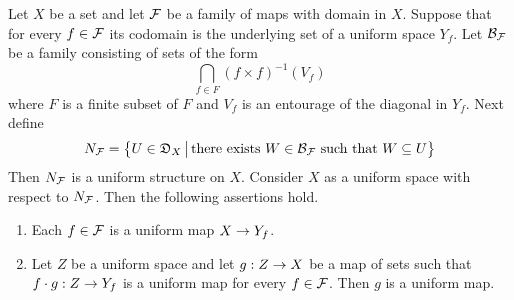 \documentclass[10pt]{amsart}
\begin{document}
\begin{theorem}\label{theorem:uniformity_induced_by_family_of_maps}
	Let $X$ be a set and let ${\mathcal F}$ be a family of maps with domain in $X$. Suppose that for every $f \in {\mathcal F}$ its codomain is the underlying set of a uniform space $Y_f$. Let ${\mathcal B}_{{\mathcal F}}$ be a family consisting of sets of the form
	$$\bigcap_{f\in F}\left(f\times f\right)^{-1}(V_f)$$
	where $F$ is a finite subset of $F$ and $V_f$ is an entourage of the diagonal in $Y_f$. Next define
	$$N_{{\mathcal F}} = \big\{U\in {\mathfrak D}_X\,\big|\,\mbox{there exists }W\in {\mathcal B}_{{\mathcal F}}\mbox{ such that }W \subseteq U\big\}$$
	Then $N_{{\mathcal F}}$ is a uniform structure on $X$. Consider $X$ as a uniform space with respect to $N_{{\mathcal F}}$. Then the following assertions hold.
	\begin{enumerate}[label=\emph{\textbf{(\arabic*)}}, leftmargin=3.0em]
		\item Each $f \in {\mathcal F}$ is a uniform map $X \rightarrow Y_f$.
		\item Let $Z$ be a uniform space and let $g:Z\rightarrow X$ be a map of sets such that $f\cdot g:Z\rightarrow Y_f$ is a uniform map for every $f\in {\mathcal F}$. Then $g$ is a uniform map.
	\end{enumerate}
\end{theorem}
\end{document}

